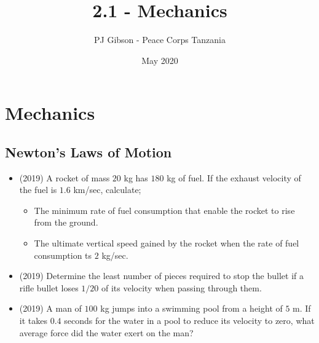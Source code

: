 \documentclass{article}
\title{2.1 - Mechanics}
\author{PJ Gibson - Peace Corps Tanzania}
\date{May 2020}
\begin{document}
\maketitle


\section{Mechanics}

\subsection{Newton’s Laws of Motion}
\begin{itemize}
\item (2019)  A rocket of mass $ 20$ kg has $ 180$ kg of fuel. If the exhaust velocity of the fuel is $ 1.6$ km/sec, calculate;
 \begin{itemize}
\item The minimum rate of fuel consumption that enable the rocket to rise from the ground. 
\item The ultimate vertical speed gained by the rocket when the rate of fuel consumption ts $ 2$ kg/sec. 
\end{itemize}
\item (2019)  Determine the least number of pieces required to stop the bullet if a rifle bullet loses $ 1/20$ of its velocity when passing through them.
\item (2019)  A man of $ 100$ kg jumps into a swimming pool from a height of $ 5$ m. If it takes $ 0.4$ seconds for the water in a pool to reduce its velocity to zero, what average force did  the water exert on the man? 
\end{itemize}
\end{document}
